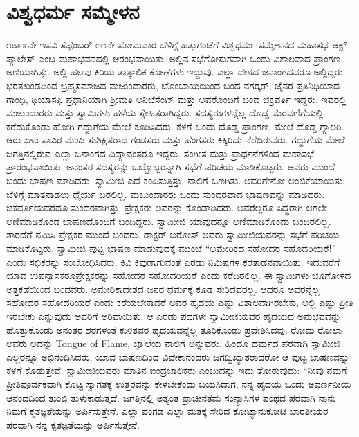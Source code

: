 
\chapter{ವಿಶ್ವಧರ್ಮ ಸಮ್ಮೇಳನ}

೧೮೯೩ನೇ ಇಸವಿ ಸೆಪ್ಟೆಂಬರ್ ೧೧ನೇ ಸೋಮವಾರ ಬೆಳಿಗ್ಗೆ ಹತ್ತುಗಂಟೆಗೆ ವಿಶ್ವಧರ್ಮ ಸಮ್ಮೇಳನದ ಮಹಾಸಭೆ ಆಕ್ಟ್ ಪ್ಯಾಲೇಸ್ ಎಂಬ ಮಹಾಭವನದಲ್ಲಿ ಆರಂಭವಾಯಿತು. ಅಲ್ಲಿನ ಸಭೆಗೋಸುಗವಾಗಿ ಒಂದು ವಿಶಾಲವಾದ ಪ್ರಾಂಗಣ ಅಣಿಯಾಗಿತ್ತು. ಅಲ್ಲಿ ಹಲವು ಕಿರಿಯ ತಾತ್ಕಾಲಿಕ ಕೋಣೆಗಳು ಇದ್ದುವು. ಎಲ್ಲಾ ದೇಶದ ಜನಾಂಗದವರೂ ಅಲ್ಲಿದ್ದರು. ಭರತಖಂಡದಿಂದ ಬ್ರಹ್ಮಸಮಾಜದ ಮಜುಂದಾರರು, ಬೊಂಬಾಯಿಯಿಂದ ಬಂದ ನಗರ್‍ಕರ್, ಜೈನರ ಪ್ರತಿನಿಧಿಯಾದ ಗಾಂಧಿ, ಥಿಯಾಸಫಿ ಪ್ರಧಾನಿಯಾಗಿ ಶ‍್ರೀಮತಿ ಅನಿಬೆಸೆಂಟ್ ಮತ್ತು ಅವರೊಂದಿಗೆ ಬಂದ ಚಕ್ರವರ್ತಿ ಇದ್ದರು. ಇವರಲ್ಲಿ ಮಜುಂದಾರರು ಮತ್ತು ಸ್ವಾಮಿಗಳು ಹಳೆಯ ಸ್ನೇಹಿತರಾಗಿದ್ದರು. ಸದಸ್ಯರುಗಳನ್ನೆಲ್ಲ ದೊಡ್ಡ ಮೆರವಣಿಗೆಯಲ್ಲಿ ಕರೆದುಕೊಂಡು ಹೋಗಿ ಗದ್ದುಗೆಯ ಮೇಲೆ ಕೂಡಿಸಿದರು. ಕೆಳಗೆ ಒಂದು ದೊಡ್ಡ ಪ್ರಾಂಗಣ. ಮೇಲೆ ದೊಡ್ಡ ಗ್ಯಾಲರಿ. ಆರು ಏಳು ಸಾವಿರ ಮಂದಿ ಸುಶಿಕ್ಷಿತರಾದ ಗಂಡಸರು ಮತ್ತು ಹೆಂಗಸರು ಕಿಕ್ಕಿರಿದು ನೆರೆದಿರುವರು. ಗದ್ದುಗೆಯ ಮೇಲೆ ಜಗತ್ತಿನಲ್ಲಿರುವ ಎಲ್ಲಾ ಜನಾಂಗದ ವಿದ್ಯಾವಂತರೂ ಇದ್ದರು. ಸಂಗೀತ ಮತ್ತು ಪ್ರಾರ್ಥನೆಗಳಿಂದ ಮಹಾಸಭೆ ಪ್ರಾರಂಭವಾಯಿತು. ಅನಂತರ ಸದಸ್ಯರನ್ನು ಒಬ್ಬೊಬ್ಬರನ್ನಾಗಿ ಸಭೆಗೆ ಪರಿಚಯ ಮಾಡಿಕೊಟ್ಟರು. ಅವರು ಮುಂದೆ ಬಂದು ಭಾಷಣ ಮಾಡಿದರು. ಸ್ವಾಮೀಜಿ ಎದೆ ಕಂಪಿಸುತ್ತಿತ್ತು. ನಾಲಿಗೆ ಒಣಗಿತು. ಅವರಿಗೇನೋ ಅಂಜಿಕೆಯಾಯಿತು. ಬೆಳಿಗ್ಗೆ ಮಾತನಾಡಲು ಧೈರ್ಯ ಬರಲಿಲ್ಲ. ಮಜುಂದಾರರು ಒಂದು ಸುಂದರವಾದ ಭಾಷಣವನ್ನು ಮಾಡಿದರು. ಚಕವರ್ತಿಯವರದೂ ಸುಂದರವಾಗಿತ್ತು. ಪ್ರೇಕ್ಷಕರು ಅವರನ್ನು ಕೊಂಡಾಡಿದರು. ಅವರೆಲ್ಲರೂ ಸಿದ್ಧರಾಗಿ ಆಗಲೇ ಅಣಿಮಾಡಿಕೊಂಡ ಭಾಷಣದೊಂದಿಗೆ ಬಂದಿದ್ದರು. ಸ್ವಾಮೀಜಿ ಯಾವುದನ್ನೂ ಅಣಿಮಾಡಿಕೊಂಡು ಬಂದಿರಲಿಲ್ಲ. ಶಾರದೆಗೆ ನಮಿಸಿ ಪ್ರೇಕ್ಷಕರ ಮುಂದೆ ಬಂದರು. ಡಾಕ್ಟರ್ ಬರೋಸ್ ಅವರು ಸ್ವಾಮೀಜಿಯವರನ್ನು ಸಭೆಗೆ ಪರಿಚಯ ಮಾಡಿಕೊಟ್ಟರು. ಸ್ವಾಮೀಜಿ ಪುಟ್ಟ ಭಾಷಣ ಮಾಡುವುದಕ್ಕೆ ಮುಂಚೆ “ಅಮೇರಿಕದ ಸಹೋದರ ಸಹೊದರಿಯರೆ!” ಎಂದು ಸಭಿಕರನ್ನು ಸಂಬೋಧಿಸಿದರು. ಕಿವಿ ಕಿವುಡಾಗುವಂತೆ ಎರಡು ನಿಮಿಷಗಳ ಕರತಾಡನವಾಯಿತು. ಇದುವರೆಗೆ ಯಾವ ಉಪನ್ಯಾಸಕರೂ\break ಪ್ರೇಕ್ಷಕರನ್ನು ಸಹೋದರ ಸಹೋದರಿಯರೆ ಎಂದು ಕರೆದಿರಲಿಲ್ಲ. ಈ ಸ್ವಾಮಿಗಳು ಭೂಗೋಳದ ಅತ್ತಕಡೆಯಿಂದ ಬಂದವರು. ಅಮೇರಿಕಾದೇಶದ ಜನರ ಧರ್ಮಕ್ಕೆ ಕೂಡ ಸೇರಿದವರಲ್ಲ. ಆದರೂ ಅವರನ್ನೆಲ್ಲ ಸಹೋದರ ಸಹೋದರಿಯರೆ ಎಂದು ಕರೆಯಬೇಕಾದರೆ ಅವರ ಹೃದಯ ಎಷ್ಟು ವಿಶಾಲವಾಗಿರಬೇಕು, ಅಲ್ಲಿ ಎಷ್ಟು ಪ್ರೀತಿ ಇರಬೇಕು ಎನ್ನುವುದು ಅವರಿಗೆ ಅರಿವಾಯಿತು. ಆ ಎರಡು ಪದಗಳೇ ಸ್ವಾಮೀಜಿಯವರ ಹೃದಯದ ಅನುಭವವನ್ನು ಹೊತ್ತುಕೊಂಡು ಅನಂತರ ಶರಗಳಂತೆ ಕುಳಿತವರ ಹೃದಯವನ್ನೆಲ್ಲ ತೂರಿಕೊಂಡು ಪ್ರವೇಶಿಸಿದವು. ರೋಮ ರೋಲಾ ಅವರು ಅದನ್ನು Tongue of Flame, ಜ್ವಾಲೆಯ ನಾಲಿಗೆ ಅನ್ನುವರು. ಹಿಂದೂ ಧರ್ಮದ ಪರವಾಗಿ ಸ್ವಾಮೀಜಿ ಎಲ್ಲರನ್ನೂ ಅಭಿನಂದಿಸಿದರು; ಯಾವ ಭಾಷಣದಿಂದ ವಿವೇಕಾನಂದರು ಜಗದ್ವಿಖ್ಯಾತರಾದರೋ ಆ ಪುಟ್ಟ ಭಾಷಣವನ್ನು ಕೆಳಗೆ ಕೊಡುತ್ತೇವೆ. ಸ್ವಾಮೀಜಿಯವರು ಮಾತಿನ ಐಂದ್ರಜಾಲಿಕರು ಎಂಬುದನ್ನು ಇದು ತೋರುವುದು: “ನೀವು ನಮಗೆ ಪ್ರೀತಿಪೂರ್ವಕವಾಗಿ ಕೊಟ್ಟ ಸ್ವಾಗತಕ್ಕೆ ಉತ್ತರವನ್ನು ಕೇಳಬೇಕೆಂದು ಬಯಸಿದಾಗ, ನನ್ನ ಹೃದಯ ಒಂದು ಅವರ್ಣನೀಯ ಆನಂದದಿಂದ ತುಂಬಿ ತುಳುಕಾಡುತ್ತದೆ. ಜಗತ್ತಿನಲ್ಲಿ ಅತ್ಯಂತ ಪ್ರಾಚೀನತಮ ಸಂನ್ಯಾಸಿಗಳ ಪಂಥದ ಪರವಾಗಿ ನಾನು ನಿಮಗೆ ಕೃತಜ್ಞತೆಯನ್ನು ಅರ್ಪಿಸುತ್ತೇನೆ. ಎಲ್ಲಾ ಪಂಗಡ ಎಲ್ಲಾ ಮತಕ್ಕೆ ಸೇರಿದ ಕೋಟ್ಯಾನುಕೋಟಿ ಭಾರತೀಯರ ಪರವಾಗಿ ನನ್ನ ಕೃತಜ್ಞತೆಯನ್ನು ಅರ್ಪಿಸುತ್ತೇನೆ.

